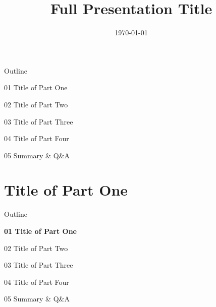 \documentclass[aspectratio=169,10pt,xcolor=table]{beamer}
\title[Short Title]{Full Presentation Title}
\subtitle{}
\author[]{}
\institute{}
\date{\today}
\begin{document}
\maketitle

\begin{frame}{Outline}
\large
\renewcommand{\baselinestretch}{1.8}\selectfont

01 \quad Title of Part One

02 \quad Title of Part Two

03 \quad Title of Part Three

04 \quad Title of Part Four

05 \quad Summary \& Q\&A
\end{frame}

\section{Title of Part One}

\begin{frame}{Outline}
\large
\renewcommand{\baselinestretch}{1.8}\selectfont

\textbf{\textcolor{maincolor}{01 \quad Title of Part One}}

02 \quad Title of Part Two

03 \quad Title of Part Three

04 \quad Title of Part Four

05 \quad Summary \& Q\&A
\end{frame}
\end{document}
